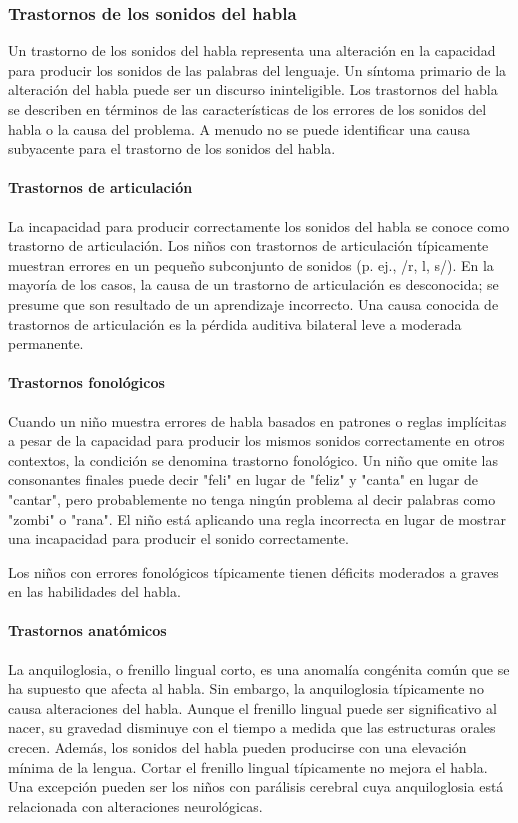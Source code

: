 \documentclass[11pt,letterpaper]{report}
\begin{document}
\subsubsection{Trastornos de los sonidos del habla}
Un trastorno de los sonidos del habla representa una alteración en la
capacidad para producir los sonidos de las palabras del lenguaje. Un síntoma
primario de la alteración del habla puede ser un discurso ininteligible. Los
trastornos del habla se describen en términos de las características de los
errores de los sonidos del habla o la causa del problema. A menudo no se puede
identificar una causa subyacente para el trastorno de los sonidos del habla.
\cite{Feldman44}

\paragraph{Trastornos de articulación}
La incapacidad para producir correctamente los sonidos del habla se conoce
como trastorno de articulación. Los niños con trastornos de articulación
típicamente muestran errores en un pequeño subconjunto de sonidos
(p. ej., /r, l, s/). En la mayoría de los casos, la causa de un trastorno de
articulación es desconocida; se presume que son resultado de un aprendizaje
incorrecto. Una causa conocida de trastornos de articulación es la pérdida
auditiva bilateral leve a moderada permanente. \cite{Feldman44}

\paragraph{Trastornos fonológicos}
Cuando un niño muestra errores de habla basados en patrones o reglas
implícitas a pesar de la capacidad para producir los mismos sonidos
correctamente en otros contextos, la condición se denomina trastorno
fonológico. Un niño que omite las consonantes finales puede decir "feli" en
lugar de "feliz" y "canta" en lugar de "cantar", pero probablemente no tenga
ningún problema al decir palabras como "zombi" o "rana". El niño está
aplicando una regla incorrecta en lugar de mostrar una incapacidad para
producir el sonido correctamente. \cite{Feldman44}

Los niños con errores fonológicos típicamente tienen déficits moderados a
graves en las habilidades del habla.

\paragraph{Trastornos anatómicos}
La anquiloglosia, o frenillo lingual corto, es una anomalía congénita común
que se ha supuesto que afecta al habla. Sin embargo, la anquiloglosia
típicamente no causa alteraciones del habla. Aunque el frenillo lingual puede
ser significativo al nacer, su gravedad disminuye con el tiempo a medida que
las estructuras orales crecen. Además, los sonidos del habla pueden producirse
con una elevación mínima de la lengua. Cortar el frenillo lingual
típicamente no mejora el habla. Una excepción pueden ser los niños con
parálisis cerebral cuya anquiloglosia está relacionada con alteraciones
neurológicas. \cite{Feldman44}
\end{document}
